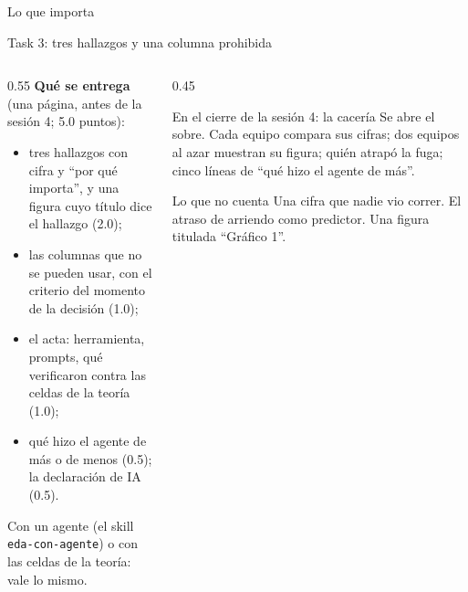 \documentclass{beamer}
\begin{document}
\begin{frame}{Lo que importa}
\end{frame}

\begin{frame}{Task 3: tres hallazgos y una columna prohibida}
\small
\begin{columns}[T]
\begin{column}{0.55\textwidth}
\textbf{Qué se entrega} (una página, antes de la sesión 4; 5.0 puntos):
\begin{itemize}\itemsep2pt
  \item tres hallazgos con cifra y ``por qué importa'', y una figura cuyo título dice el hallazgo (2.0);
  \item las columnas que no se pueden usar, con el criterio del momento de la decisión (1.0);
  \item el acta: herramienta, prompts, qué verificaron contra las celdas de la teoría (1.0);
  \item qué hizo el agente de más o de menos (0.5); la declaración de IA (0.5).
\end{itemize}
Con un agente (el skill \texttt{eda-con-agente}) o con las celdas de la teoría: vale lo mismo.
\end{column}
\begin{column}{0.45\textwidth}
\begin{exampleblock}{En el cierre de la sesión 4: la cacería}
Se abre el sobre. Cada equipo compara sus cifras; dos equipos al azar muestran su figura; quién atrapó la fuga; cinco líneas de ``qué hizo el agente de más''.
\end{exampleblock}
\begin{alertblock}{Lo que no cuenta}
Una cifra que nadie vio correr. El atraso de arriendo como predictor. Una figura titulada ``Gráfico 1''.
\end{alertblock}
\end{column}
\end{columns}
\end{frame}
\end{document}

